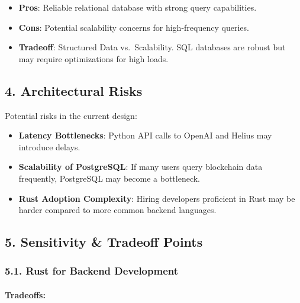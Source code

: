 \documentclass[
]{article}
\providecommand{\tightlist}{%
  \setlength{\itemsep}{0pt}\setlength{\parskip}{0pt}}
\begin{document}
\begin{enumerate}
  \begin{itemize}
  \tightlist
  \item
    \textbf{Pros}: Reliable relational database with strong query
    capabilities.
  \item
    \textbf{Cons}: Potential scalability concerns for high-frequency
    queries.
  \item
    \textbf{Tradeoff}: Structured Data vs.~Scalability. SQL databases
    are robust but may require optimizations for high loads.
  \end{itemize}
\end{enumerate}

\hypertarget{architectural-risks}{%
\subsection{\texorpdfstring{\textbf{4. Architectural
Risks}}{4. Architectural Risks}}\label{architectural-risks}}

Potential risks in the current design:

\begin{itemize}
\tightlist
\item
  \textbf{Latency Bottlenecks}: Python API calls to OpenAI and Helius
  may introduce delays.
\item
  \textbf{Scalability of PostgreSQL}: If many users query blockchain
  data frequently, PostgreSQL may become a bottleneck.
\item
  \textbf{Rust Adoption Complexity}: Hiring developers proficient in
  Rust may be harder compared to more common backend languages.
\end{itemize}

\hypertarget{sensitivity-tradeoff-points}{%
\subsection{\texorpdfstring{\textbf{5. Sensitivity \& Tradeoff
Points}}{5. Sensitivity \& Tradeoff Points}}\label{sensitivity-tradeoff-points}}

\hypertarget{rust-for-backend-development}{%
\subsubsection{\texorpdfstring{\textbf{5.1. Rust for Backend
Development}}{5.1. Rust for Backend Development}}\label{rust-for-backend-development}}

\hypertarget{tradeoffs}{%
\paragraph{\texorpdfstring{\textbf{Tradeoffs:}}{Tradeoffs:}}\label{tradeoffs}}
\end{document}
